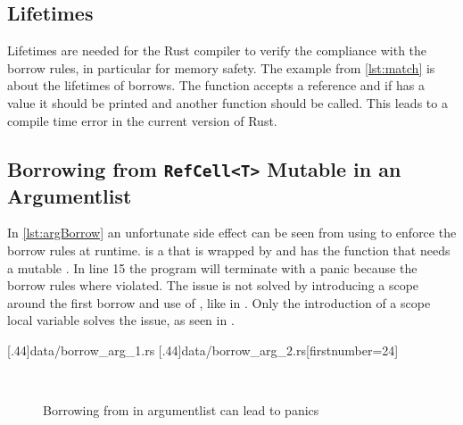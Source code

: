\documentclass[thesis]{subfiles}
\begin{document}
  \subsection{Lifetimes}
    Lifetimes are needed for the Rust compiler to verify the compliance with the borrow rules, in particular for memory safety.
    The example from \autoref{lst:match} is about the lifetimes of borrows.
    The function \fun accepts a \Foo reference and if  has a value it should be printed and another function should be called.
    This leads to a compile time error in the current version of Rust.
    \autocite[2094-nll]{rust-rfc}


  \subsection{Borrowing from \texttt{RefCell<T>} Mutable in an Argumentlist}
    In \autoref{lst:argBorrow} an unfortunate side effect can be seen from using \RefCellT to enforce the borrow rules at runtime.
    \F is a \struct that is wrapped by \RefCellT and has the function \fun that needs a mutable \Self.
    In line 15 the program will terminate with a panic because the borrow rules where violated.
    The issue is not solved by introducing a scope around the first borrow and use of , like in \hun.
    Only the introduction of a scope local variable solves the issue, as seen in \nun.

    \LstTikzBox{\borrowArgOne}[.44\linewidth]{data/borrow_arg_1.rs}
    \LstTikzBox{\borrowArgTwo}[.44\linewidth]{data/borrow_arg_2.rs}[firstnumber=24]
    \begin{figure}[ht]
      \captionsetup{type=lstlisting}
      \centering
      \usebox{\borrowArgOne}\hfill%
      \usebox{\borrowArgTwo}\\\vspace*{.75em}%
      \caption{Borrowing from \RefCellT in argumentlist can lead to panics}\label{lst:argBorrow}
    \end{figure}
\end{document}

